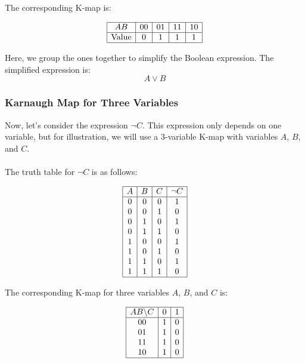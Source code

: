 The corresponding K-map is:

\[
	\begin{array}{|c|c|c|c|c|}
		\hline
		AB           & 00 & 01 & 11 & 10 \\
		\hline
		\text{Value} & 0  & 1  & 1  & 1  \\
		\hline
	\end{array}
\]

Here, we group the ones together to simplify the Boolean expression. The simplified expression is:
\[
	A \lor B
\]

\subsubsection*{Karnaugh Map for Three Variables}

Now, let's consider the expression \( \neg C \). This expression only depends on one variable, but for illustration, we will use a 3-variable K-map with variables \( A \), \( B \), and \( C \).
\\\\
The truth table for \( \neg C \) is as follows:

\[
	\begin{array}{|c|c|c|c|}
		\hline
		A & B & C & \neg C \\
		\hline
		0 & 0 & 0 & 1      \\
		0 & 0 & 1 & 0      \\
		0 & 1 & 0 & 1      \\
		0 & 1 & 1 & 0      \\
		1 & 0 & 0 & 1      \\
		1 & 0 & 1 & 0      \\
		1 & 1 & 0 & 1      \\
		1 & 1 & 1 & 0      \\
		\hline
	\end{array}
\]

The corresponding K-map for three variables \( A \), \( B \), and \( C \) is:

\[
	\begin{array}{|c|c|c|c|}
		\hline
		AB \backslash C & 0 & 1 \\
		\hline
		00              & 1 & 0 \\
		01              & 1 & 0 \\
		11              & 1 & 0 \\
		10              & 1 & 0 \\
		\hline
	\end{array}
\]


